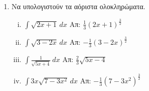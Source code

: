 \documentclass[a4paper,table]{report}
\begin{document}
\begin{center}
  \minibox{{\large\bfseries \textcolor{Col1}{Ασκήσεις στα Αόριστα Ολοκληρώματα}}}
\end{center}
\vspace{\baselineskip}

\begin{enumerate}
  \item Να υπολογιστούν τα αόριστα ολοκληρώματα.
    \begin{enumerate}[i)]
      \item $ \int \sqrt{ 2x+1 } \,{dx} $ 
        \hfill Απ: $ \frac{ 1 }{ 3 } (2x+1)^{\frac{ 3 }{ 2 } } $
      \item $ \int \sqrt{ 3-2x } \,{dx} $ 
        \hfill Απ: $ - \frac{ 1}{ 3 }(3-2x)^{\frac{ 3 }{ 2 }}  $
      \item $ \int \frac{1}{ \sqrt{ 5x+4 } } \,{dx} $ 
        \hfill Απ: $ \frac{ 2 }{ 3 } \sqrt{ 5x-4 } $
      \item $ \int 3x \sqrt{ 7-3x^{2} } \,{dx} $ 
        \hfill Απ: $ - \frac{1}{ 3 } (7-3x^{2})^{\frac{ 3 }{ 2 }} $
    \end{enumerate}


\end{enumerate}
\end{document}
